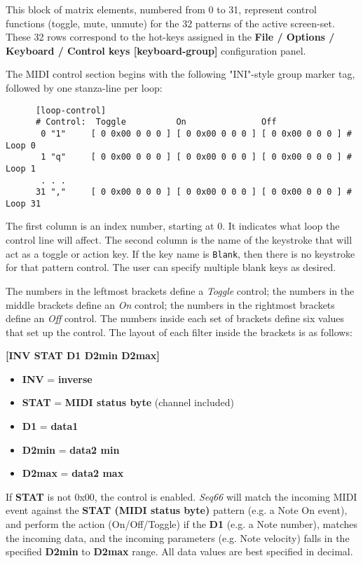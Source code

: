    This block of matrix elements, numbered from 0 to 31,
   represent control functions (toggle, mute, unmute) for the 32 patterns
   of the active screen-set.
   These 32 rows correspond to the hot-keys assigned in
   the \textbf{File / Options / Keyboard / Control keys [keyboard-group]} 
   configuration panel.

   The MIDI control section begins with the following "INI"-style
   group marker tag, followed by one stanza-line per loop:

   \begin{verbatim}
      [loop-control]
      # Control:  Toggle          On               Off
       0 "1"     [ 0 0x00 0 0 0 ] [ 0 0x00 0 0 0 ] [ 0 0x00 0 0 0 ] # Loop 0
       1 "q"     [ 0 0x00 0 0 0 ] [ 0 0x00 0 0 0 ] [ 0 0x00 0 0 0 ] # Loop 1
       . . .
      31 ","     [ 0 0x00 0 0 0 ] [ 0 0x00 0 0 0 ] [ 0 0x00 0 0 0 ] # Loop 31
   \end{verbatim}

   The first column is an index number, starting at 0.  It indicates what
   loop the control line will affect.
   The second column is the name of the keystroke that will act as a toggle or
   action key.
   If the key name is \texttt{Blank}, then there is no keystroke for that
   pattern control.  The user can specify multiple blank keys as desired.

   The numbers in the leftmost brackets define a \textsl{Toggle} control;
   the numbers in the middle brackets define an \textsl{On} control;
   the numbers in the rightmost brackets define an \textsl{Off} control.
   The numbers inside each set of brackets define six values that set up the
   control.  The layout of each filter inside the brackets is as follows:

      \textbf{[INV STAT D1 D2min D2max]}

   \begin{itemize}
      \item \textbf{INV} = \textbf{inverse}
      \item \textbf{STAT} = \textbf{MIDI status byte} (channel included) 
      \item \textbf{D1} = \textbf{data1}
      \item \textbf{D2min} = \textbf{data2 min}
      \item \textbf{D2max} = \textbf{data2 max}
   \end{itemize}

   If \textbf{STAT} is not 0x00, the control is enabled.  \textsl{Seq66} will
   match the incoming MIDI event against the \textbf{STAT (MIDI status byte)}
   pattern (e.g. a Note On event), and perform the action (On/Off/Toggle) if
   the \textbf{D1} (e.g. a Note number), matches the incoming data, and the
   incoming parameters (e.g. Note velocity) falls in the specified
   \textbf{D2min} to \textbf{D2max} range.  All data values are best specified
   in decimal.

